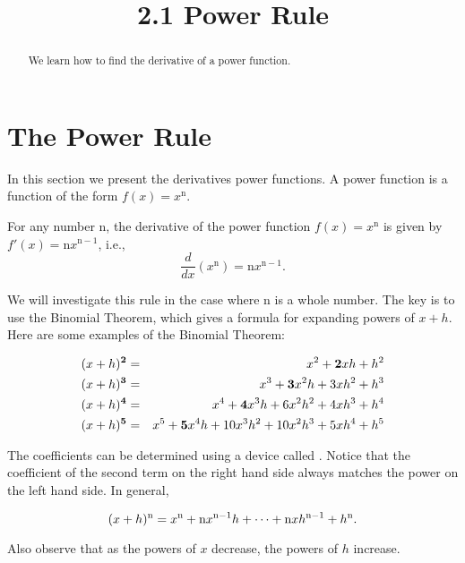 \documentclass{ximera}
\title{2.1 Power Rule}
\begin{document}
\begin{abstract}
We learn how to find the derivative of a power function.
\end{abstract}

\maketitle


\section{The Power Rule}

In this section we present the derivatives power functions. A power function is a function of the form $f(x) = x^\text{n}$.  







\begin{theorem}
For any number n, the derivative of the power function $f(x) = x^\text{n}$ is given by
$f'(x) = \text{n}x^{\text{n} -1}$, i.e.,
\[\frac{d}{dx} \left(x^\text{n}\right) = \text{n}x^{\text{n}-1}.\]
\end{theorem}

We will investigate this rule in the case where n is a whole number. The key is to use the Binomial Theorem, which gives a formula for expanding powers of $x+h$. 
Here are some examples of the Binomial Theorem:

\begin{eqnarray*}
(x+h)^{\bf 2} &=&x^2 + {\bf 2}xh + h^2\\
(x+h)^{\bf 3} &=& x^3 + {\bf 3}x^2h + 3xh^2 + h^3\\
(x+h)^{\bf 4} &=& x^4 + {\bf 4}x^3h+ 6x^2h^2 + 4xh^3 + h^4\\
(x+h)^{\bf 5} &=& x^5 + {\bf 5}x^4h + 10x^3h^2 + 10x^2h^3 + 5xh^4 + h^5
\end{eqnarray*}

The coefficients can be  determined using a device called .
Notice that the coefficient of the second term on the right hand side always matches the power on the left hand side. In general,

\[(x+h)^{\bf \text{n}} = x^\text{n} + {\bf \text{n}}x^{\text{n}-1}h + \dots + \text{n}xh^{\text{n}-1} + h^\text{n}.\]

Also observe that as the powers of $x$ decrease, the powers of $h$ increase.\\
\end{document}
